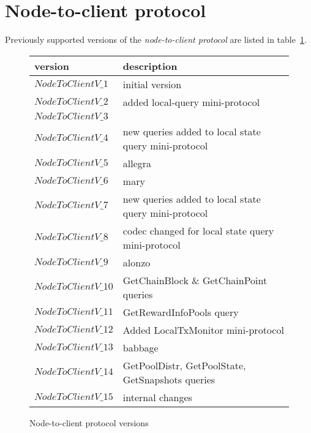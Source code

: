 \documentclass{report}
\begin{document}
\section{Node-to-client protocol}
Previously supported versions of the \textit{node-to-client protocol} are listed
in table~\ref{table:historical-node-to-client-protocol-versions}.
\begin{figure}[h]
  \begin{center}
    \begin{tabular}{l|l}
      version         & description \\\hline\hline
      $NodeToClientV\_1$ & initial version\\\hline
      $NodeToClientV\_2$ & added local-query mini-protocol\\\hline
      $NodeToClientV\_3$ & \\\hline
      $NodeToClientV\_4$ & new queries added to local state query mini-protocol\\\hline
      $NodeToClientV\_5$ & allegra \\\hline
      $NodeToClientV\_6$ & mary \\\hline
      $NodeToClientV\_7$ & new queries added to local state query mini-protocol\\\hline
      $NodeToClientV\_8$ & codec changed for local state query mini-protocol\\\hline
      $NodeToClientV\_9$ & alonzo \\\hline
      $NodeToClientV\_10$ & GetChainBlock \& GetChainPoint queries \\\hline
      $NodeToClientV\_11$ & GetRewardInfoPools query \\\hline
      $NodeToClientV\_12$ & Added LocalTxMonitor mini-protocol \\\hline
      $NodeToClientV\_13$ & babbage \\\hline
      $NodeToClientV\_14$ & GetPoolDistr, GetPoolState, GetSnapshots queries \\\hline
      $NodeToClientV\_15$ & internal changes \\\hline
    \end{tabular}
    \caption{Node-to-client protocol versions}
    \label{table:historical-node-to-client-protocol-versions}
  \end{center}
\end{figure}



\end{document}
